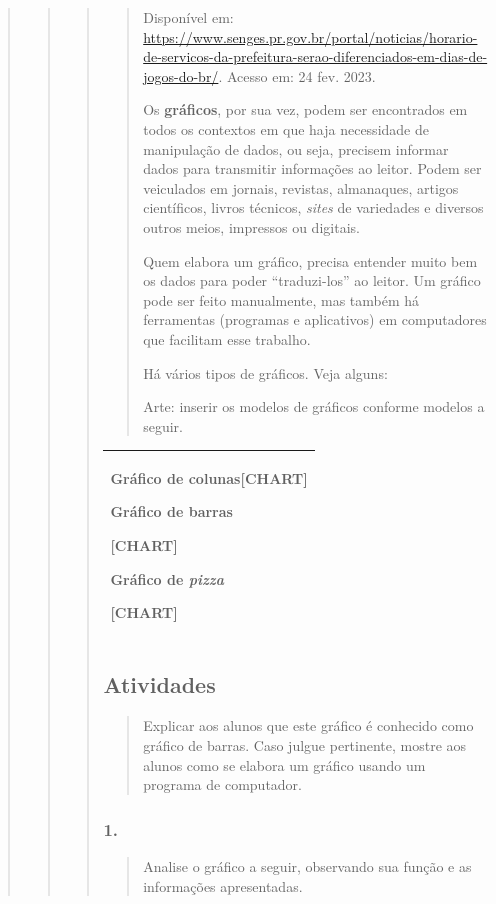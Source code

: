\begin{quote}
\begin{quote}
\begin{quote}
\begin{quote}
Disponível em:
\url{https://www.senges.pr.gov.br/portal/noticias/horario-de-servicos-da-prefeitura-serao-diferenciados-em-dias-de-jogos-do-br/}.
Acesso em: 24 fev. 2023.

Os \textbf{gráficos}, por sua vez, podem ser encontrados em todos os
contextos em que haja necessidade de manipulação de dados, ou seja,
precisem informar dados para transmitir informações ao leitor. Podem ser
veiculados em jornais, revistas, almanaques, artigos científicos, livros
técnicos, \emph{sites} de variedades e diversos outros meios, impressos
ou digitais.

Quem elabora um gráfico, precisa entender muito bem os dados para poder
``traduzi-los'' ao leitor. Um gráfico pode ser feito manualmente, mas
também há ferramentas (programas e aplicativos) em computadores que
facilitam esse trabalho.

Há vários tipos de gráficos. Veja alguns:

Arte: inserir os modelos de gráficos conforme modelos a seguir.
\end{quote}

\begin{longtable}[]{@{}l@{}}
\toprule
\begin{minipage}[t]{0.97\columnwidth}\raggedright\strut
Gráfico de colunas{{[}CHART{]}}

Gráfico de barras

{{[}CHART{]}}

Gráfico de \emph{pizza}

{{[}CHART{]}}\strut
\end{minipage}\tabularnewline
\bottomrule
\end{longtable}

\subsection{Atividades}\label{atividades-8}

\begin{quote}
Explicar aos alunos que este gráfico é conhecido como gráfico de barras.
Caso julgue pertinente, mostre aos alunos como se elabora um gráfico
usando um programa de computador.
\end{quote}

\subsubsection{1. }\label{section-66}

\begin{quote}
Analise o gráfico a seguir, observando sua função e as informações
apresentadas.


\end{quote}
\end{quote}
\end{quote}
\end{quote}
